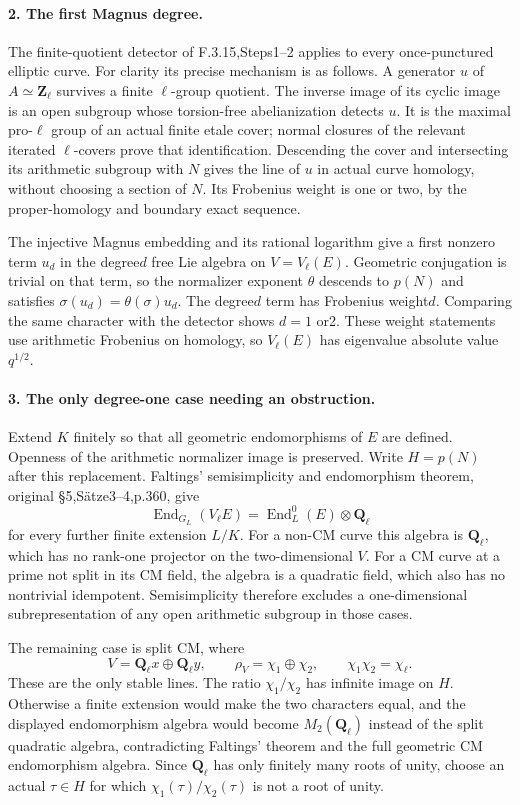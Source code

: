 \paragraph{2. The first Magnus degree.}
The finite-quotient detector of F.3.15,Steps1--2 applies to every
once-punctured elliptic curve. For clarity its precise mechanism is
as follows. A generator $u$ of $A\simeq\mathbf Z_\ell$ survives a
finite $\ell$-group quotient. The inverse image of its cyclic image
is an open subgroup whose torsion-free abelianization detects $u$.
It is the maximal pro-$\ell$ group of an actual finite etale cover;
normal closures of the relevant iterated $\ell$-covers prove that
identification. Descending the cover and intersecting its arithmetic
subgroup with $N$ gives the line of $u$ in actual curve homology,
without choosing a section of $N$. Its Frobenius weight is one or
two, by the proper-homology and boundary exact sequence.

The injective Magnus embedding and its rational logarithm give a
first nonzero term $u_d$ in the degree$d$ free Lie algebra on
$V=V_\ell(E)$. Geometric conjugation is trivial on that term, so the
normalizer exponent $\theta$ descends to $p(N)$ and satisfies
$\sigma(u_d)=\theta(\sigma)u_d$. The degree$d$ term has Frobenius
weight$d$. Comparing the same character with the detector shows
$d=1$ or2. These weight statements use arithmetic Frobenius on
homology, so $V_\ell(E)$ has eigenvalue absolute value$q^{1/2}$.

\paragraph{3. The only degree-one case needing an obstruction.}
Extend $K$ finitely so that all geometric endomorphisms of $E$ are
defined. Openness of the arithmetic normalizer image is preserved.
Write $H=p(N)$ after this replacement. Faltings' semisimplicity and
endomorphism theorem, original \S5,S\"atze3--4,p.360, give
\[
 \operatorname{End}_{G_L}(V_\ell E)
 =\operatorname{End}^0_L(E)\otimes\mathbf Q_\ell
\]
for every further finite extension $L/K$.
For a non-CM curve this algebra is $\mathbf Q_\ell$, which has no
rank-one projector on the two-dimensional $V$. For a CM curve at a
prime not split in its CM field, the algebra is a quadratic field,
which also has no nontrivial idempotent. Semisimplicity therefore
excludes a one-dimensional subrepresentation of any open arithmetic
subgroup in those cases.

The remaining case is split CM, where
\[
 V=\mathbf Q_\ell x\oplus\mathbf Q_\ell y,
 \qquad \rho_V=\chi_1\oplus\chi_2,
 \qquad \chi_1\chi_2=\chi_\ell.
\]
These are the only stable lines. The ratio $\chi_1/\chi_2$ has
infinite image on $H$. Otherwise a finite extension would make the
two characters equal, and the displayed endomorphism algebra would
become $M_2(\mathbf Q_\ell)$ instead of the split quadratic algebra,
contradicting Faltings' theorem and the full geometric CM
endomorphism algebra. Since $\mathbf Q_\ell$ has only finitely many
roots of unity, choose an actual $\tau\in H$ for which
$\chi_1(\tau)/\chi_2(\tau)$ is not a root of unity.

